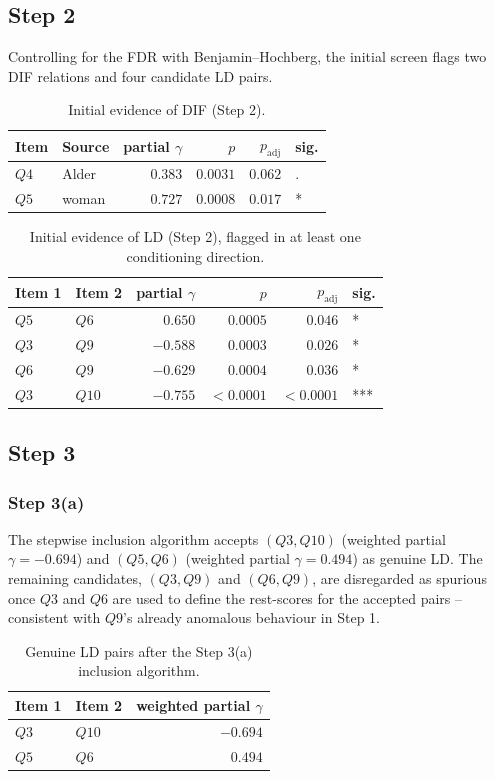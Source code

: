 \subsection{Step 2}
Controlling for the FDR with Benjamin--Hochberg, the initial screen flags two DIF relations and four candidate LD pairs.
\begin{table}[H]
\centering
\begin{tabular}{@{}llrrrl@{}}
\toprule
Item & Source & partial $\gamma$ & $p$ & $p_{\mathrm{adj}}$ & sig. \\
\midrule
$Q4$ & Alder & $0.383$ & $0.0031$ & $0.062$ & . \\
$Q5$ & woman & $0.727$ & $0.0008$ & $0.017$ & * \\
\bottomrule
\end{tabular}
\caption{Initial evidence of DIF (Step 2).}
\label{tab:ak_step2_dif}
\end{table}
\begin{table}[H]
\centering
\begin{tabular}{@{}llrrrl@{}}
\toprule
Item 1 & Item 2 & partial $\gamma$ & $p$ & $p_{\mathrm{adj}}$ & sig. \\
\midrule
$Q5$  & $Q6$  & $0.650$  & $0.0005$ & $0.046$ & * \\
$Q3$  & $Q9$  & $-0.588$ & $0.0003$ & $0.026$ & * \\
$Q6$  & $Q9$  & $-0.629$ & $0.0004$ & $0.036$ & * \\
$Q3$  & $Q10$ & $-0.755$ & $<0.0001$ & $<0.0001$ & *** \\
\bottomrule
\end{tabular}
\caption{Initial evidence of LD (Step 2), flagged in at least one conditioning direction.}
\label{tab:ak_step2_ld}
\end{table}

\subsection{Step 3}
\subsubsection{Step 3(a)}
The stepwise inclusion algorithm accepts $(Q3,Q10)$ (weighted partial $\gamma=-0.694$) and $(Q5,Q6)$ (weighted partial $\gamma=0.494$) as genuine LD. The remaining candidates, $(Q3,Q9)$ and $(Q6,Q9)$, are disregarded as spurious once $Q3$ and $Q6$ are used to define the rest-scores for the accepted pairs -- consistent with $Q9$'s already anomalous behaviour in Step 1.
\begin{table}[H]
\centering
\begin{tabular}{@{}llr@{}}
\toprule
Item 1 & Item 2 & weighted partial $\gamma$ \\
\midrule
$Q3$ & $Q10$ & $-0.694$ \\
$Q5$ & $Q6$  & $0.494$ \\
\bottomrule
\end{tabular}
\caption{Genuine LD pairs after the Step 3(a) inclusion algorithm.}
\label{tab:ak_step3a}
\end{table}


